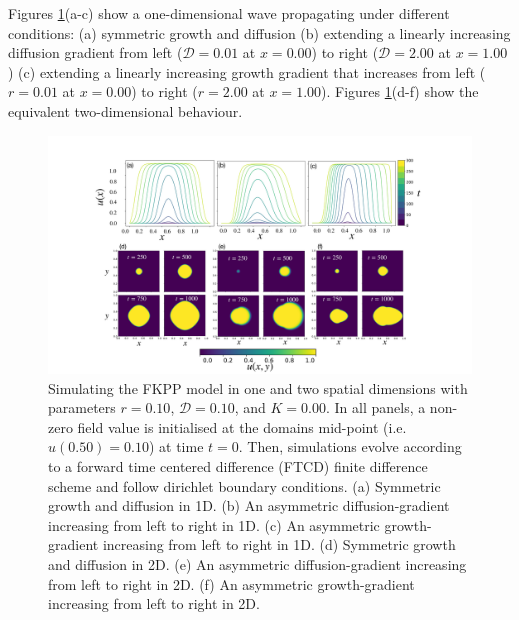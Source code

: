 Figures \ref{fig:fkpp}(a-c) show a one-dimensional wave propagating under different conditions:
(a) symmetric growth and diffusion
(b) extending a linearly increasing diffusion gradient from left ($\mathcal{D}=0.01$ at $x=0.00$) to right
($\mathcal{D}=2.00$ at $x=1.00$)
(c) extending a linearly increasing growth gradient that increases from left ($r=0.01$ at $x=0.00$) to right
($r=2.00$ at $x=1.00$).
Figures \ref{fig:fkpp}(d-f) show the equivalent two-dimensional behaviour.

\begin{figure}
    \centering
    \includegraphics[scale=0.325]{chapter2/figures/FKPP.pdf}
    \caption{
    Simulating the FKPP model in one and two spatial dimensions with parameters $r=0.10$, $\mathcal{D}=0.10$, and $K=0.00$. 
    In all panels, a non-zero field value is initialised at the domains mid-point (i.e. $u(0.50)=0.10$) at time $t=0$.
    Then, simulations evolve according to a forward time centered difference (FTCD) finite difference scheme and
    follow dirichlet boundary conditions. 
    (a) Symmetric growth and diffusion in 1D.
    (b) An asymmetric diffusion-gradient increasing from left to right in 1D.
    (c) An asymmetric growth-gradient increasing from left to right in 1D.
    (d) Symmetric growth and diffusion in 2D.
    (e) An asymmetric diffusion-gradient increasing from left to right in 2D.
    (f) An asymmetric growth-gradient increasing from left to right in 2D.}
    \label{fig:fkpp}
\end{figure}

